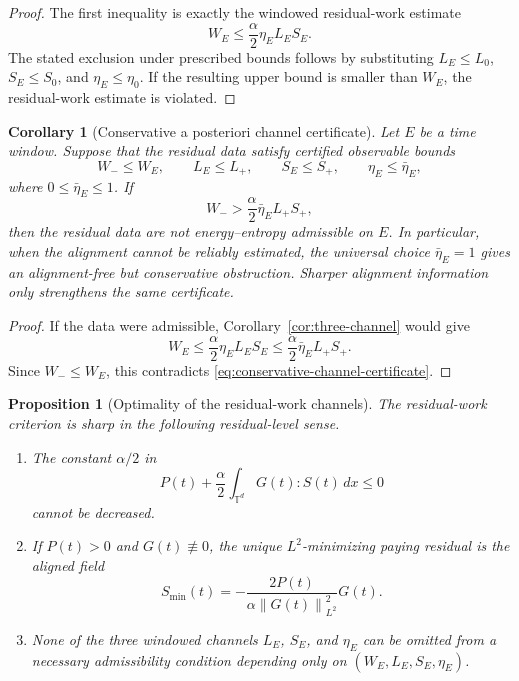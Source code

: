 \documentclass[11pt]{article}
\numberwithin{equation}{section}
\newtheorem{proposition}[theorem]{Proposition}
\newtheorem{corollary}[theorem]{Corollary}
\newcommand{\T}{\mathbb T}
\newcommand{\norm}[1]{\left\lVert #1\right\rVert}
\begin{document}
\begin{proof}
The first inequality is exactly the windowed residual-work estimate
\[
  W_E\le \frac{\alpha}{2}\eta_E L_ES_E .
\]
The stated exclusion under prescribed bounds follows by substituting
\(L_E\le L_0\), \(S_E\le S_0\), and \(\eta_E\le\eta_0\).  If the resulting upper
bound is smaller than \(W_E\), the residual-work estimate is violated.
\end{proof}

\begin{corollary}[Conservative a posteriori channel certificate]
\label{cor:conservative-channel-certificate}
Let \(E\) be a time window.  Suppose that the residual data satisfy certified
observable bounds
\[
  W_-\le W_E,\qquad L_E\le L_+,\qquad S_E\le S_+,\qquad
  \eta_E\le \bar\eta_E ,
\]
where \(0\le\bar\eta_E\le1\).  If
\begin{equation}
  W_->\frac{\alpha}{2}\bar\eta_E L_+S_+,
  \label{eq:conservative-channel-certificate}
\end{equation}
then the residual data are not energy--entropy admissible on \(E\).  In
particular, when the alignment cannot be reliably estimated, the universal
choice \(\bar\eta_E=1\) gives an alignment-free but conservative obstruction.
Sharper alignment information only strengthens the same certificate.
\end{corollary}

\begin{proof}
If the data were admissible, Corollary~\ref{cor:three-channel} would give
\[
  W_E\le \frac{\alpha}{2}\eta_E L_ES_E
  \le \frac{\alpha}{2}\bar\eta_E L_+S_+ .
\]
Since \(W_-\le W_E\), this contradicts
\eqref{eq:conservative-channel-certificate}.
\end{proof}

\begin{proposition}[Optimality of the residual-work channels]
\label{prop:channel-optimality}
The residual-work criterion is sharp in the following residual-level sense.
\begin{enumerate}
\item The constant \(\alpha/2\) in
\[
  P(t)+\frac{\alpha}{2}\int_{\T^d}G(t):S(t)\,dx\le0
\]
cannot be decreased.
\item If \(P(t)>0\) and \(G(t)\not\equiv0\), the unique \(L^2\)-minimizing
paying residual is the aligned field
\[
  S_{\min}(t)=
  -\frac{2P(t)}{\alpha\norm{G(t)}_{L^2}^2}G(t).
\]
\item None of the three windowed channels \(L_E\), \(S_E\), and \(\eta_E\) can
be omitted from a necessary admissibility condition depending only on
\((W_E,L_E,S_E,\eta_E)\).
\end{enumerate}
\end{proposition}
\end{document}
